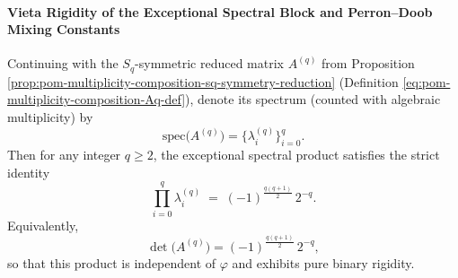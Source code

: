 %
%

\paragraph{Vieta Rigidity of the Exceptional Spectral Block and Perron--Doob Mixing Constants}

\begin{theorem}\label{thm:pom-replica-softcore-exceptional-spectrum-product}
Continuing with the
\(S_q\)-symmetric reduced matrix \(A^{(q)}\) from Proposition \ref{prop:pom-multiplicity-composition-sq-symmetry-reduction} (Definition \eqref{eq:pom-multiplicity-composition-Aq-def}),
denote its spectrum (counted with algebraic multiplicity) by
\[
\mathrm{spec}\!\bigl(A^{(q)}\bigr)=\{\lambda_i^{(q)}\}_{i=0}^{q}.
\]
Then for any integer \(q\ge 2\), the exceptional spectral product satisfies the strict identity
\begin{equation}\label{eq:pom-replica-softcore-exceptional-product}
\boxed{\;
\prod_{i=0}^{q}\lambda_i^{(q)}
\;=\;
(-1)^{\frac{q(q+1)}{2}}\,2^{-q}. \;}
\end{equation}
Equivalently,
\[
\det\!\bigl(A^{(q)}\bigr)=(-1)^{\frac{q(q+1)}{2}}\,2^{-q},
\]
so that this product is independent of \(\varphi\) and exhibits pure binary rigidity.
\end{theorem}
